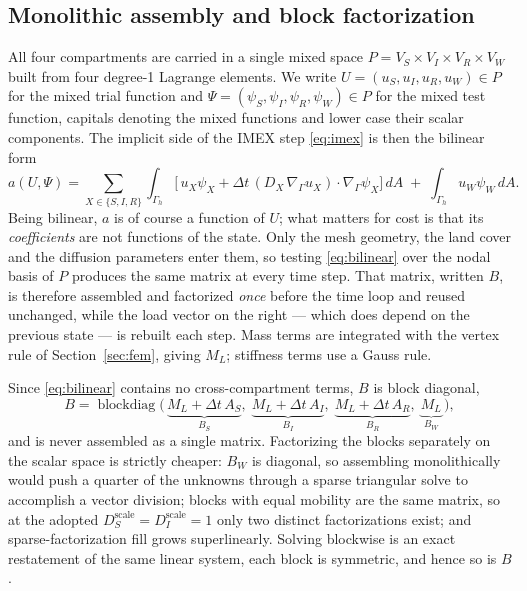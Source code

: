 \documentclass[11pt]{article}
\newcommand{\Grad}{\nabla_\Gamma}
\begin{document}
\subsection{Monolithic assembly and block factorization}
\label{sec:monolithic}

All four compartments are carried in a single mixed space $P = V_S \times V_I \times V_R \times V_W$ built from four degree-1 Lagrange elements. We write $U = (u_S,u_I,u_R,u_W) \in P$ for the mixed trial function and $\Psi = (\psi_S,\psi_I,\psi_R,\psi_W) \in P$ for the mixed test function, capitals denoting the mixed functions and lower case their scalar components. The implicit side of the IMEX step \eqref{eq:imex} is then the bilinear form
\begin{equation}
a(U,\Psi) = \sum_{X\in\{S,I,R\}} \int_{\Gamma_h}\Big[\,u_X \psi_X + \Delta t\,(D_X\,\Grad u_X)\cdot\Grad \psi_X\Big]\,dA \;+\; \int_{\Gamma_h} u_W \psi_W\, dA .
\label{eq:bilinear}
\end{equation}
Being bilinear, $a$ is of course a function of $U$; what matters for cost is that its \emph{coefficients} are not functions of the state. Only the mesh geometry, the land cover and the diffusion parameters enter them, so testing \eqref{eq:bilinear} over the nodal basis of $P$ produces the same matrix at every time step. That matrix, written $B$, is therefore assembled and factorized \emph{once} before the time loop and reused unchanged, while the load vector on the right --- which does depend on the previous state --- is rebuilt each step. Mass terms are integrated with the vertex rule of Section~\ref{sec:fem}, giving $M_L$; stiffness terms use a Gauss rule.

Since \eqref{eq:bilinear} contains no cross-compartment terms, $B$ is block diagonal,
\begin{equation}
B = \operatorname{blockdiag}\big(\,\underbrace{M_L + \Delta t\,A_S}_{B_S},\;\underbrace{M_L + \Delta t\,A_I}_{B_I},\;\underbrace{M_L + \Delta t\,A_R}_{B_R},\;\underbrace{M_L}_{B_W}\,\big),
\label{eq:blockdiag}
\end{equation}
and is never assembled as a single matrix. Factorizing the blocks separately on the scalar space is strictly cheaper: $B_W$ is diagonal, so assembling monolithically would push a quarter of the unknowns through a sparse triangular solve to accomplish a vector division; blocks with equal mobility are the same matrix, so at the adopted $D_S^{\text{scale}} = D_I^{\text{scale}} = 1$ only two distinct factorizations exist; and sparse-factorization fill grows superlinearly. Solving blockwise is an exact restatement of the same linear system, each block is symmetric, and hence so is $B$.
\end{document}
